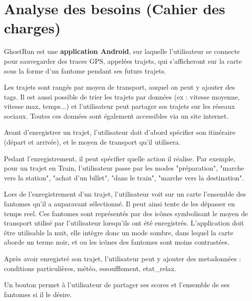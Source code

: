 \chapter{Analyse des besoins (Cahier des charges)}

GhostRun est une \textbf{application Android},  sur laquelle l'utilisateur se connecte pour sauvegarder des traces GPS, appelées trajets, qui s'afficheront sur la carte sous la forme d'un \gls{fantome} pendant ses futurs trajets.

Les trajets sont rangés par moyen de transport, auquel on peut y ajouter des \glspl{tag}.
Il est aussi possible de trier les trajets par données (ex : vitesse moyenne, vitesse max, temps...) et l'utilisateur peut partager ses trajets sur les réseaux sociaux.
Toutes ces données sont également accessibles via un site internet.

Avant d'enregistrer un trajet, l'utilisateur doit d'abord spécifier son itinéraire (départ et arrivée), et le moyen de transport qu'il utilisera. 

Pedant l'enregistrement, il peut spécifier quelle action il réalise. Par exemple, pour un trajet en Train, l'utilisateur passe par les modes "préparation", "marche vers la station", "achat d'un billet", "dans le train", "marche vers la destination".

Lors de l'enregistrement d'un trajet, l'utilisateur voit sur un carte l'ensemble des \glspl{fantome} qu'il a auparavant sélectionné. Il peut ainsi tente de les dépasser en temps reel. Ces \glspl{fantome} sont représentés par des icônes symbolisant le moyen de transport utilisé par l'utilisateur lorsqu'ils ont été enregistrés. L'application doit être utilisable la nuit, elle intègre donc un mode sombre, dans lequel la carte aborde un terme noir, et ou les icônes des \glspl{fantome} sont moins contrastées.

Après avoir enregistré son trajet, l'utilisateur peut y ajouter des metadonnées : conditions particulières, météo, essoufflement, \gls{etat_relax}.


Un bouton permet à l'utilisateur de partager ses scores et l'ensemble de ses \glspl{fantome} si il le désire.